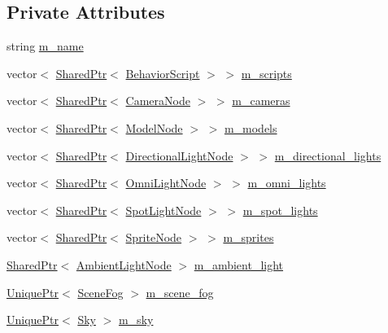 \subsection*{Private Attributes}
\begin{DoxyCompactItemize}
\item 
string \hyperlink{classmage_1_1_scene_a6cc8cb08b1853c4e3063b33a94e8fb47}{m\+\_\+name}
\item 
vector$<$ \hyperlink{namespacemage_a1e01ae66713838a7a67d30e44c67703e}{Shared\+Ptr}$<$ \hyperlink{classmage_1_1_behavior_script}{Behavior\+Script} $>$ $>$ \hyperlink{classmage_1_1_scene_a84548bf6978f8955ce5892cb23536a4e}{m\+\_\+scripts}
\item 
vector$<$ \hyperlink{namespacemage_a1e01ae66713838a7a67d30e44c67703e}{Shared\+Ptr}$<$ \hyperlink{classmage_1_1_camera_node}{Camera\+Node} $>$ $>$ \hyperlink{classmage_1_1_scene_a76fc089ae3185c82702d2ca42fd820e7}{m\+\_\+cameras}
\item 
vector$<$ \hyperlink{namespacemage_a1e01ae66713838a7a67d30e44c67703e}{Shared\+Ptr}$<$ \hyperlink{classmage_1_1_model_node}{Model\+Node} $>$ $>$ \hyperlink{classmage_1_1_scene_a01132a667fbc1517f11ae561bc221071}{m\+\_\+models}
\item 
vector$<$ \hyperlink{namespacemage_a1e01ae66713838a7a67d30e44c67703e}{Shared\+Ptr}$<$ \hyperlink{namespacemage_a7637b5351fc0f66a10badd80ebb35899}{Directional\+Light\+Node} $>$ $>$ \hyperlink{classmage_1_1_scene_a895f2ae809c17be09072f6bb89fd4e9c}{m\+\_\+directional\+\_\+lights}
\item 
vector$<$ \hyperlink{namespacemage_a1e01ae66713838a7a67d30e44c67703e}{Shared\+Ptr}$<$ \hyperlink{namespacemage_a1724c6e6b6b5ba535cdd967cbbb4a669}{Omni\+Light\+Node} $>$ $>$ \hyperlink{classmage_1_1_scene_a881c3dd7e85e5069650f29fd2722bf78}{m\+\_\+omni\+\_\+lights}
\item 
vector$<$ \hyperlink{namespacemage_a1e01ae66713838a7a67d30e44c67703e}{Shared\+Ptr}$<$ \hyperlink{namespacemage_aeed5dee4ff6c591eabb0e9114256df4a}{Spot\+Light\+Node} $>$ $>$ \hyperlink{classmage_1_1_scene_a4e1954bc0b812d6a71123ca3ac9eeb75}{m\+\_\+spot\+\_\+lights}
\item 
vector$<$ \hyperlink{namespacemage_a1e01ae66713838a7a67d30e44c67703e}{Shared\+Ptr}$<$ \hyperlink{classmage_1_1_sprite_node}{Sprite\+Node} $>$ $>$ \hyperlink{classmage_1_1_scene_a2d68edf08b57dde36ec7cf1f5a91d281}{m\+\_\+sprites}
\item 
\hyperlink{namespacemage_a1e01ae66713838a7a67d30e44c67703e}{Shared\+Ptr}$<$ \hyperlink{namespacemage_ab0783a7428706251f8561dc30a4d228d}{Ambient\+Light\+Node} $>$ \hyperlink{classmage_1_1_scene_a0ce9718f4b0137a52b858a29d3504328}{m\+\_\+ambient\+\_\+light}
\item 
\hyperlink{namespacemage_a3316d7143a973e37adf1110f2e80ca31}{Unique\+Ptr}$<$ \hyperlink{classmage_1_1_scene_fog}{Scene\+Fog} $>$ \hyperlink{classmage_1_1_scene_a58f8d29322664c4c5895703a6cbc9000}{m\+\_\+scene\+\_\+fog}
\item 
\hyperlink{namespacemage_a3316d7143a973e37adf1110f2e80ca31}{Unique\+Ptr}$<$ \hyperlink{classmage_1_1_sky}{Sky} $>$ \hyperlink{classmage_1_1_scene_a90163a34ed39216b14175c4b799abd46}{m\+\_\+sky}
\end{DoxyCompactItemize}


